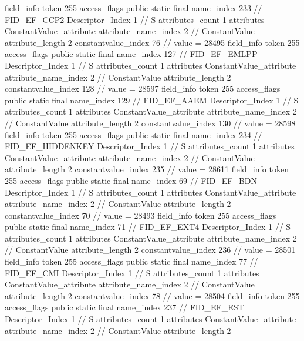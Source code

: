 {{{{			field_info {
				token	255
				access_flags	public static final
				name_index	233		// FID_EF_CCP2
				Descriptor_Index	1		// S
				attributes_count	1
				attributes {
				ConstantValue_attribute {
					attribute_name_index	2		// ConstantValue
					attribute_length	2
					constantvalue_index	76		// value = 28495
				}
				}
			}
			field_info {
				token	255
				access_flags	public static final
				name_index	127		// FID_EF_EMLPP
				Descriptor_Index	1		// S
				attributes_count	1
				attributes {
				ConstantValue_attribute {
					attribute_name_index	2		// ConstantValue
					attribute_length	2
					constantvalue_index	128		// value = 28597
				}
				}
			}
			field_info {
				token	255
				access_flags	public static final
				name_index	129		// FID_EF_AAEM
				Descriptor_Index	1		// S
				attributes_count	1
				attributes {
				ConstantValue_attribute {
					attribute_name_index	2		// ConstantValue
					attribute_length	2
					constantvalue_index	130		// value = 28598
				}
				}
			}
			field_info {
				token	255
				access_flags	public static final
				name_index	234		// FID_EF_HIDDENKEY
				Descriptor_Index	1		// S
				attributes_count	1
				attributes {
				ConstantValue_attribute {
					attribute_name_index	2		// ConstantValue
					attribute_length	2
					constantvalue_index	235		// value = 28611
				}
				}
			}
			field_info {
				token	255
				access_flags	public static final
				name_index	69		// FID_EF_BDN
				Descriptor_Index	1		// S
				attributes_count	1
				attributes {
				ConstantValue_attribute {
					attribute_name_index	2		// ConstantValue
					attribute_length	2
					constantvalue_index	70		// value = 28493
				}
				}
			}
			field_info {
				token	255
				access_flags	public static final
				name_index	71		// FID_EF_EXT4
				Descriptor_Index	1		// S
				attributes_count	1
				attributes {
				ConstantValue_attribute {
					attribute_name_index	2		// ConstantValue
					attribute_length	2
					constantvalue_index	236		// value = 28501
				}
				}
			}
			field_info {
				token	255
				access_flags	public static final
				name_index	77		// FID_EF_CMI
				Descriptor_Index	1		// S
				attributes_count	1
				attributes {
				ConstantValue_attribute {
					attribute_name_index	2		// ConstantValue
					attribute_length	2
					constantvalue_index	78		// value = 28504
				}
				}
			}
			field_info {
				token	255
				access_flags	public static final
				name_index	237		// FID_EF_EST
				Descriptor_Index	1		// S
				attributes_count	1
				attributes {
				ConstantValue_attribute {
					attribute_name_index	2		// ConstantValue
					attribute_length	2
}}}}}}}
